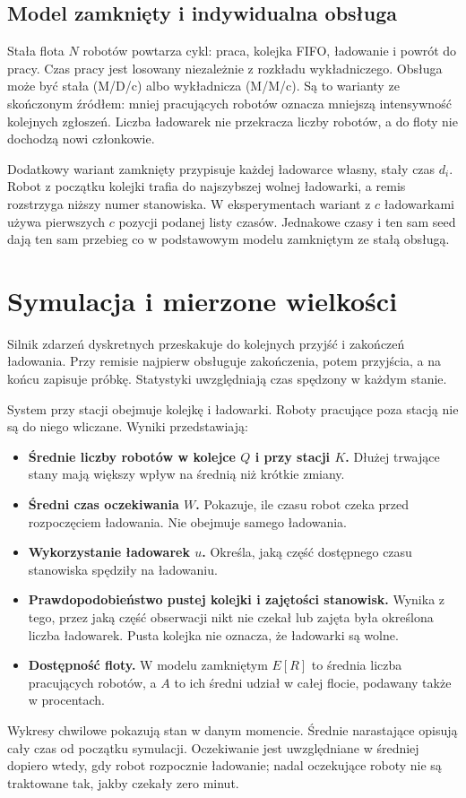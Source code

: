 \documentclass[11pt,a4paper]{article}
\begin{document}
\subsection{Model zamknięty i indywidualna obsługa}
Stała flota $N$ robotów powtarza cykl: praca, kolejka FIFO, ładowanie i powrót do pracy. Czas pracy jest losowany niezależnie z rozkładu wykładniczego. Obsługa może być stała (M/D/c) albo wykładnicza (M/M/c). Są to warianty ze skończonym źródłem: mniej pracujących robotów oznacza mniejszą intensywność kolejnych zgłoszeń. Liczba ładowarek nie przekracza liczby robotów, a do floty nie dochodzą nowi członkowie.

Dodatkowy wariant zamknięty przypisuje każdej ładowarce własny, stały czas $d_i$. Robot z początku kolejki trafia do najszybszej wolnej ładowarki, a remis rozstrzyga niższy numer stanowiska. W eksperymentach wariant z $c$ ładowarkami używa pierwszych $c$ pozycji podanej listy czasów. Jednakowe czasy i ten sam seed dają ten sam przebieg co w podstawowym modelu zamkniętym ze stałą obsługą.

\clearpage
\section{Symulacja i mierzone wielkości}
Silnik zdarzeń dyskretnych przeskakuje do kolejnych przyjść i zakończeń ładowania. Przy remisie najpierw obsługuje zakończenia, potem przyjścia, a na końcu zapisuje próbkę. Statystyki uwzględniają czas spędzony w każdym stanie.

System przy stacji obejmuje kolejkę i ładowarki. Roboty pracujące poza stacją nie są do niego wliczane. Wyniki przedstawiają:
\begin{itemize}
\item \textbf{Średnie liczby robotów w kolejce $Q$ i przy stacji $K$.} Dłużej trwające stany mają większy wpływ na średnią niż krótkie zmiany.
\item \textbf{Średni czas oczekiwania $W$.} Pokazuje, ile czasu robot czeka przed rozpoczęciem ładowania. Nie obejmuje samego ładowania.
\item \textbf{Wykorzystanie ładowarek $u$.} Określa, jaką część dostępnego czasu stanowiska spędziły na ładowaniu.
\item \textbf{Prawdopodobieństwo pustej kolejki i zajętości stanowisk.} Wynika z tego, przez jaką część obserwacji nikt nie czekał lub zajęta była określona liczba ładowarek. Pusta kolejka nie oznacza, że ładowarki są wolne.
\item \textbf{Dostępność floty.} W modelu zamkniętym $E[R]$ to średnia liczba pracujących robotów, a $A$ to ich średni udział w całej flocie, podawany także w procentach.
\end{itemize}
Wykresy chwilowe pokazują stan w danym momencie. Średnie narastające opisują cały czas od początku symulacji. Oczekiwanie jest uwzględniane w średniej dopiero wtedy, gdy robot rozpocznie ładowanie; nadal oczekujące roboty nie są traktowane tak, jakby czekały zero minut.
\end{document}
